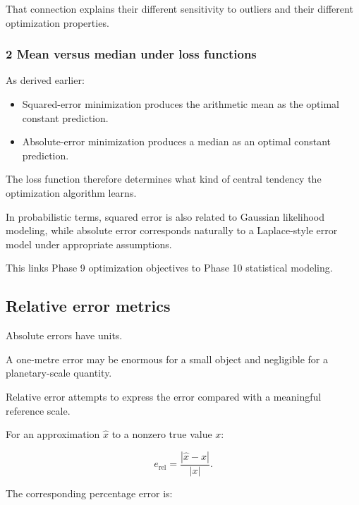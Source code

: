 That connection explains their different sensitivity to outliers and their different optimization properties.

\subsubsection{2 Mean versus median under loss functions}\label{02-foundations-ii-ch030-mean-versus-median-under-loss-functions}

\hypertarget{02-foundations-ii-ch030-mean-versus-median-under-loss-functions}{}

As derived earlier:

\begin{itemize}
\tightlist
\item
  Squared-error minimization produces the arithmetic mean as the optimal constant prediction.
\item
  Absolute-error minimization produces a median as an optimal constant prediction.
\end{itemize}

The loss function therefore determines what kind of central tendency the optimization algorithm learns.

In probabilistic terms, squared error is also related to Gaussian likelihood modeling, while absolute error corresponds naturally to a Laplace-style error model under appropriate assumptions.

This links Phase 9 optimization objectives to Phase 10 statistical modeling.

\subsection{Relative error metrics}\label{02-foundations-ii-ch030-relative-error-metrics}

\hypertarget{02-foundations-ii-ch030-relative-error-metrics}{}

Absolute errors have units.

A one-metre error may be enormous for a small object and negligible for a planetary-scale quantity.

Relative error attempts to express the error compared with a meaningful reference scale.

For an approximation \(\hat x\) to a nonzero true value \(x\):

\[
 \boxed{ e_{\mathrm{rel}} = \frac{|\hat x-x|}{|x|} }.
\]

The corresponding percentage error is:

